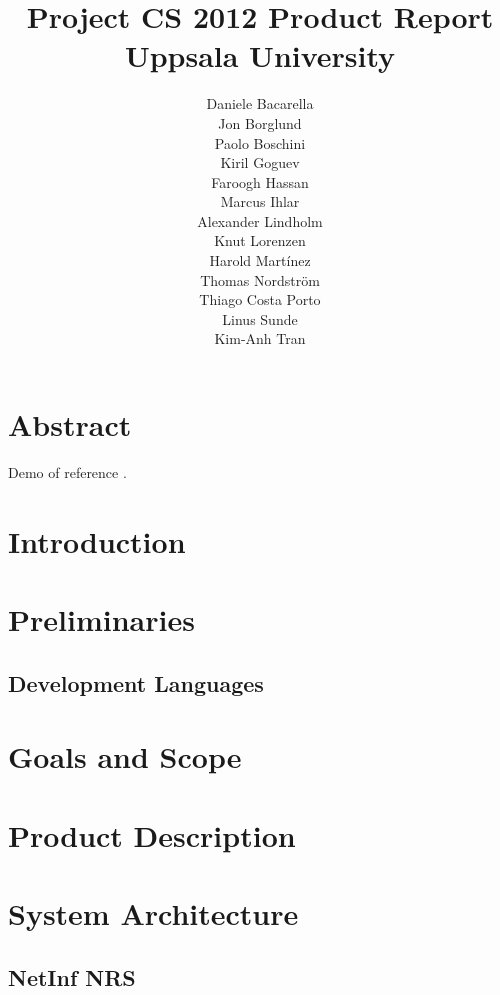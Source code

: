 \documentclass[11pt]{report}
\title{Project CS 2012 Product Report\\Uppsala University\\}
\author{Daniele Bacarella\\
		Jon Borglund\\
		Paolo Boschini\\
		Kiril Goguev\\
		Faroogh Hassan\\
		Marcus Ihlar\\
		Alexander Lindholm\\
		Knut Lorenzen\\
		Harold Mart\'{i}nez\\
		Thomas Nordstr\"om\\
		Thiago Costa Porto\\
		Linus Sunde\\
		Kim-Anh Tran
}
\date{}
\begin{document}
\maketitle

\tableofcontents

\chapter{Abstract}

Demo of reference \cite{b1}. 
\chapter{Introduction}


\chapter{Preliminaries}

\section{Development Languages}


\chapter{Goals and Scope}



\chapter{Product Description}





\chapter{System Architecture}



\section {NetInf NRS}


\end{document}
